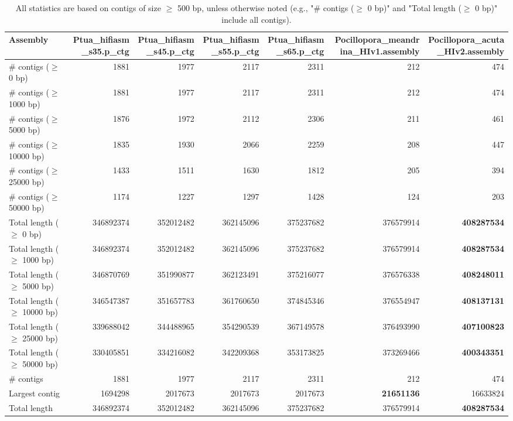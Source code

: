 \documentclass[12pt,a4paper]{article}
\begin{document}
\begin{table}[ht]
\begin{center}
\caption{All statistics are based on contigs of size $\geq$ 500 bp, unless otherwise noted (e.g., "\# contigs ($\geq$ 0 bp)" and "Total length ($\geq$ 0 bp)" include all contigs).}
\begin{tabular}{|l*{6}{|r}|}
\hline
Assembly & Ptua\_hifiasm\_s35.p\_ctg & Ptua\_hifiasm\_s45.p\_ctg & Ptua\_hifiasm\_s55.p\_ctg & Ptua\_hifiasm\_s65.p\_ctg & Pocillopora\_meandrina\_HIv1.assembly & Pocillopora\_acuta\_HIv2.assembly \\ \hline
\# contigs ($\geq$ 0 bp) & 1881 & 1977 & 2117 & 2311 & 212 & 474 \\ \hline
\# contigs ($\geq$ 1000 bp) & 1881 & 1977 & 2117 & 2311 & 212 & 474 \\ \hline
\# contigs ($\geq$ 5000 bp) & 1876 & 1972 & 2112 & 2306 & 211 & 461 \\ \hline
\# contigs ($\geq$ 10000 bp) & 1835 & 1930 & 2066 & 2259 & 208 & 447 \\ \hline
\# contigs ($\geq$ 25000 bp) & 1433 & 1511 & 1630 & 1812 & 205 & 394 \\ \hline
\# contigs ($\geq$ 50000 bp) & 1174 & 1227 & 1297 & 1428 & 124 & 203 \\ \hline
Total length ($\geq$ 0 bp) & 346892374 & 352012482 & 362145096 & 375237682 & 376579914 & {\bf 408287534} \\ \hline
Total length ($\geq$ 1000 bp) & 346892374 & 352012482 & 362145096 & 375237682 & 376579914 & {\bf 408287534} \\ \hline
Total length ($\geq$ 5000 bp) & 346870769 & 351990877 & 362123491 & 375216077 & 376576338 & {\bf 408248011} \\ \hline
Total length ($\geq$ 10000 bp) & 346547387 & 351657783 & 361760650 & 374845346 & 376554947 & {\bf 408137131} \\ \hline
Total length ($\geq$ 25000 bp) & 339688042 & 344488965 & 354290539 & 367149578 & 376493990 & {\bf 407100823} \\ \hline
Total length ($\geq$ 50000 bp) & 330405851 & 334216082 & 342209368 & 353173825 & 373269466 & {\bf 400343351} \\ \hline
\# contigs & 1881 & 1977 & 2117 & 2311 & 212 & 474 \\ \hline
Largest contig & 1694298 & 2017673 & 2017673 & 2017673 & {\bf 21651136} & 16633824 \\ \hline
Total length & 346892374 & 352012482 & 362145096 & 375237682 & 376579914 & {\bf 408287534} \\ \hline

\end{tabular}
\end{center}
\end{table}
\end{document}
